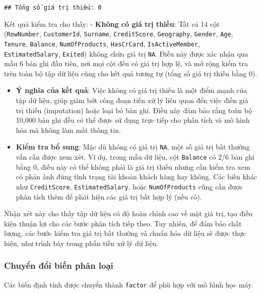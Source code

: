 \documentclass[
]{article}
\begin{document}
\begin{verbatim}
## Tổng số giá trị thiếu: 0
\end{verbatim}

Kết quả kiểm tra cho thấy: - \textbf{Không có giá trị thiếu}: Tất cả 14
cột (\texttt{RowNumber}, \texttt{CustomerId}, \texttt{Surname},
\texttt{CreditScore}, \texttt{Geography}, \texttt{Gender}, \texttt{Age},
\texttt{Tenure}, \texttt{Balance}, \texttt{NumOfProducts},
\texttt{HasCrCard}, \texttt{IsActiveMember}, \texttt{EstimatedSalary},
\texttt{Exited}) không chứa giá trị \texttt{NA}. Điều này được xác nhận
qua mẫu 6 bản ghi đầu tiên, nơi mọi cột đều có giá trị hợp lệ, và mở
rộng kiểm tra trên toàn bộ tập dữ liệu cũng cho kết quả tương tự (tổng
số giá trị thiếu bằng 0).

\begin{itemize}
\item
  \textbf{Ý nghĩa của kết quả}: Việc không có giá trị thiếu là một điểm
  mạnh của tập dữ liệu, giúp giảm bớt công đoạn tiền xử lý liên quan đến
  việc điền giá trị thiếu (imputation) hoặc loại bỏ bản ghi. Điều này
  đảm bảo rằng toàn bộ 10,000 bản ghi đều có thể được sử dụng trực tiếp
  cho phân tích và mô hình hóa mà không làm mất thông tin.
\item
  \textbf{Kiểm tra bổ sung}: Mặc dù không có giá trị \texttt{NA}, một số
  giá trị bất thường vẫn cần được xem xét. Ví dụ, trong mẫu dữ liệu, cột
  \texttt{Balance} có 2/6 bản ghi bằng 0, điều này có thể không phải là
  giá trị thiếu nhưng cần kiểm tra xem có phản ánh đúng tình trạng tài
  khoản khách hàng hay không. Các biến khác như \texttt{CreditScore},
  \texttt{EstimatedSalary}, hoặc \texttt{NumOfProducts} cũng cần được
  phân tích thêm để phát hiện các giá trị bất hợp lý (nếu có).
\end{itemize}

Nhận xét này cho thấy tập dữ liệu có độ hoàn chỉnh cao về mặt giá trị,
tạo điều kiện thuận lợi cho các bước phân tích tiếp theo. Tuy nhiên, để
đảm bảo chất lượng, các bước kiểm tra giá trị bất thường và chuẩn hóa dữ
liệu sẽ được thực hiện, như trình bày trong phần tiền xử lý dữ liệu.

\subsubsection{Chuyển đổi biến phân loại}\label{sec-categorical}

Các biến định tính được chuyển thành \texttt{factor} để phù hợp với mô
hình học máy.
\end{document}
